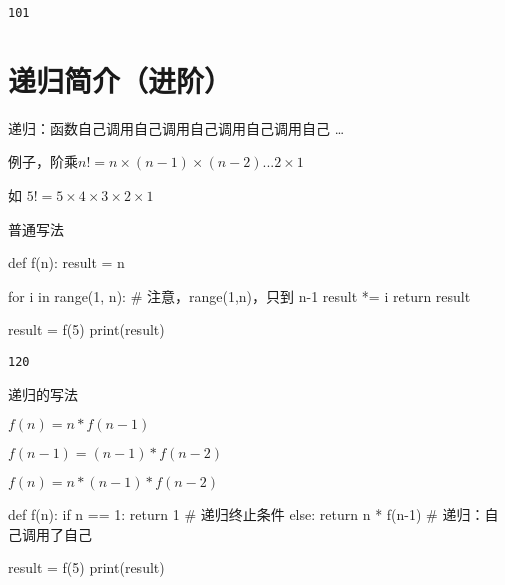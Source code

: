 \documentclass[
  letterpaper,
  DIV=11,
  numbers=noendperiod]{scrreprt}
\newenvironment{Shaded}{\begin{snugshade}}{\end{snugshade}}
\newcommand{\BuiltInTok}[1]{\textcolor[rgb]{0.00,0.23,0.31}{#1}}
\newcommand{\CommentTok}[1]{\textcolor[rgb]{0.37,0.37,0.37}{#1}}
\newcommand{\ControlFlowTok}[1]{\textcolor[rgb]{0.00,0.23,0.31}{#1}}
\newcommand{\DecValTok}[1]{\textcolor[rgb]{0.68,0.00,0.00}{#1}}
\newcommand{\KeywordTok}[1]{\textcolor[rgb]{0.00,0.23,0.31}{#1}}
\newcommand{\NormalTok}[1]{\textcolor[rgb]{0.00,0.23,0.31}{#1}}
\newcommand{\OperatorTok}[1]{\textcolor[rgb]{0.37,0.37,0.37}{#1}}
\begin{document}
\begin{verbatim}
101
\end{verbatim}

\hypertarget{ux9012ux5f52ux7b80ux4ecbux8fdbux9636}{%
\section{递归简介（进阶）}\label{ux9012ux5f52ux7b80ux4ecbux8fdbux9636}}

递归：函数自己调用自己调用自己调用自己调用自己 \ldots{}

例子，阶乘\(n! = n \times (n-1) \times (n-2) ... 2 \times 1\)

如 \(5! = 5 \times 4 \times 3 \times 2 \times 1\)

普通写法

\begin{Shaded}
\begin{Highlighting}[]
\KeywordTok{def}\NormalTok{ f(n):}
\NormalTok{    result }\OperatorTok{=}\NormalTok{ n}
    
    \ControlFlowTok{for}\NormalTok{ i }\KeywordTok{in} \BuiltInTok{range}\NormalTok{(}\DecValTok{1}\NormalTok{, n): }\CommentTok{\# 注意，range(1,n)，只到 n{-}1}
\NormalTok{        result }\OperatorTok{*=}\NormalTok{ i}
    \ControlFlowTok{return}\NormalTok{ result}
 
\NormalTok{result }\OperatorTok{=}\NormalTok{ f(}\DecValTok{5}\NormalTok{)}
\BuiltInTok{print}\NormalTok{(result)}
\end{Highlighting}
\end{Shaded}

\begin{verbatim}
120
\end{verbatim}

递归的写法

\(f(n) = n * f(n-1)\)

\(f(n - 1) = (n - 1) * f(n - 2)\)

\(f(n) = n * (n - 1) * f(n - 2)\)

\begin{Shaded}
\begin{Highlighting}[]
\KeywordTok{def}\NormalTok{ f(n):}
    \ControlFlowTok{if}\NormalTok{ n }\OperatorTok{==} \DecValTok{1}\NormalTok{:}
        \ControlFlowTok{return} \DecValTok{1}          \CommentTok{\# 递归终止条件}
    \ControlFlowTok{else}\NormalTok{:}
        \ControlFlowTok{return}\NormalTok{ n }\OperatorTok{*}\NormalTok{ f(n}\OperatorTok{{-}}\DecValTok{1}\NormalTok{) }\CommentTok{\# 递归：自己调用了自己}

\NormalTok{result }\OperatorTok{=}\NormalTok{ f(}\DecValTok{5}\NormalTok{)}
\BuiltInTok{print}\NormalTok{(result)}
\end{Highlighting}
\end{Shaded}
\end{document}
